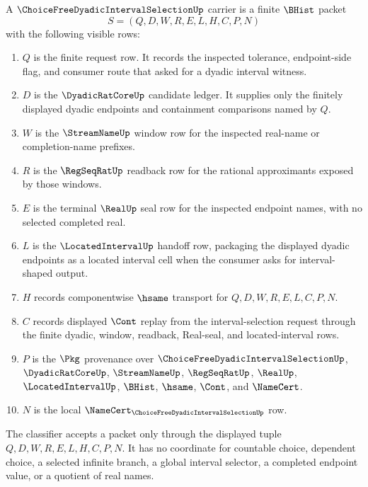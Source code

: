 \begin{definition}
\label{def:choice-free-dyadic-interval-selection-carrier}
A $\ChoiceFreeDyadicIntervalSelectionUp$ carrier is a finite $\BHist$ packet
$$
S=(Q,D,W,R,E,L,H,C,P,N)
$$
with the following visible rows:
\begin{enumerate}
\item $Q$ is the finite request row. It records the inspected tolerance, endpoint-side flag, and consumer route that asked for a dyadic interval witness.
\item $D$ is the $\DyadicRatCoreUp$ candidate ledger. It supplies only the finitely displayed dyadic endpoints and containment comparisons named by $Q$.
\item $W$ is the $\StreamNameUp$ window row for the inspected real-name or completion-name prefixes.
\item $R$ is the $\RegSeqRatUp$ readback row for the rational approximants exposed by those windows.
\item $E$ is the terminal $\RealUp$ seal row for the inspected endpoint names, with no selected completed real.
\item $L$ is the $\LocatedIntervalUp$ handoff row, packaging the displayed dyadic endpoints as a located interval cell when the consumer asks for interval-shaped output.
\item $H$ records componentwise $\hsame$ transport for $Q,D,W,R,E,L,C,P,N$.
\item $C$ records displayed $\Cont$ replay from the interval-selection request through the finite dyadic, window, readback, Real-seal, and located-interval rows.
\item $P$ is the $\Pkg$ provenance over $\ChoiceFreeDyadicIntervalSelectionUp$, $\DyadicRatCoreUp$, $\StreamNameUp$, $\RegSeqRatUp$, $\RealUp$, $\LocatedIntervalUp$, $\BHist$, $\hsame$, $\Cont$, and $\NameCert$.
\item $N$ is the local $\NameCert_{\ChoiceFreeDyadicIntervalSelectionUp}$ row.
\end{enumerate}
The classifier accepts a packet only through the displayed tuple $Q,D,W,R,E,L,H,C,P,N$. It has no coordinate for countable choice, dependent choice, a selected infinite branch, a global interval selector, a completed endpoint value, or a quotient of real names.
\end{definition}

